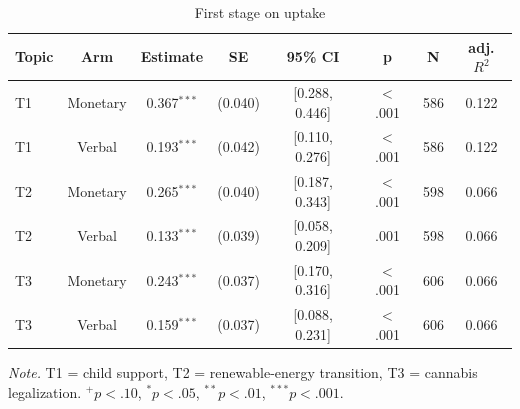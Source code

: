 \begin{table}[htbp]
\centering
\begin{threeparttable}
\caption{First stage on uptake}
\label{tab:tab_first_stage}
\begin{tabular}{lccccccc}
\toprule
  Topic & Arm & Estimate & SE & 95\% CI & p & N & adj. $R^2$ \\
\midrule
  T1 & Monetary & 0.367$^{***}$ & (0.040) & [0.288, 0.446] & $<$.001 & 586 & 0.122 \\
  T1 & Verbal & 0.193$^{***}$ & (0.042) & [0.110, 0.276] & $<$.001 & 586 & 0.122 \\
  T2 & Monetary & 0.265$^{***}$ & (0.040) & [0.187, 0.343] & $<$.001 & 598 & 0.066 \\
  T2 & Verbal & 0.133$^{***}$ & (0.039) & [0.058, 0.209] & .001 & 598 & 0.066 \\
  T3 & Monetary & 0.243$^{***}$ & (0.037) & [0.170, 0.316] & $<$.001 & 606 & 0.066 \\
  T3 & Verbal & 0.159$^{***}$ & (0.037) & [0.088, 0.231] & $<$.001 & 606 & 0.066 \\
\bottomrule
\end{tabular}
\begin{tablenotes}\footnotesize\item \textit{Note.} T1 = child support, T2 = renewable-energy transition, T3 = cannabis legalization. $^{+}p<.10$, $^{*}p<.05$, $^{**}p<.01$, $^{***}p<.001$.\end{tablenotes}
\end{threeparttable}
\end{table}
